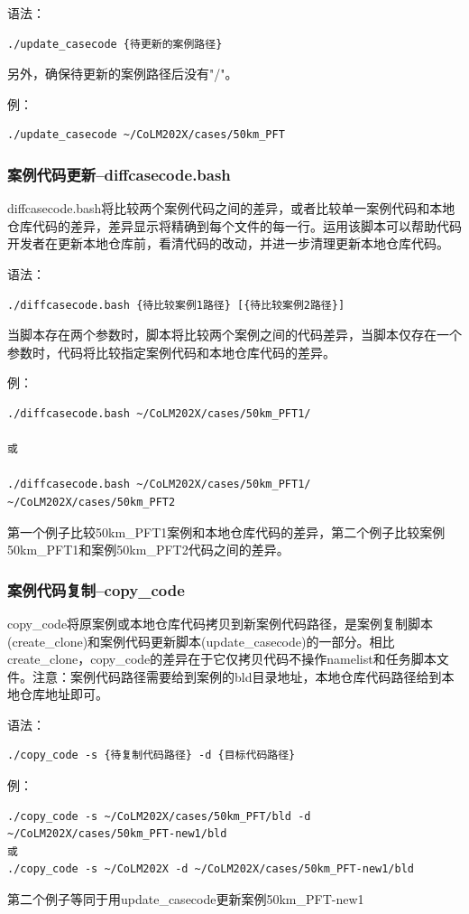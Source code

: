 语法：
\begin{lstlisting}
./update_casecode {待更新的案例路径}
\end{lstlisting}
另外，确保待更新的案例路径后没有"/"。

例：
\begin{lstlisting}
./update_casecode ~/CoLM202X/cases/50km_PFT
\end{lstlisting}

\subsubsection{案例代码更新--diffcasecode.bash}

diffcasecode.bash将比较两个案例代码之间的差异，或者比较单一案例代码和本地仓库代码的差异，差异显示将精确到每个文件的每一行。运用该脚本可以帮助代码开发者在更新本地仓库前，看清代码的改动，并进一步清理更新本地仓库代码。

语法：

\begin{lstlisting}
./diffcasecode.bash {待比较案例1路径} [{待比较案例2路径}]
\end{lstlisting}

当脚本存在两个参数时，脚本将比较两个案例之间的代码差异，当脚本仅存在一个参数时，代码将比较指定案例代码和本地仓库代码的差异。

例：
\begin{lstlisting}
./diffcasecode.bash ~/CoLM202X/cases/50km_PFT1/

或

./diffcasecode.bash ~/CoLM202X/cases/50km_PFT1/ ~/CoLM202X/cases/50km_PFT2
\end{lstlisting}

第一个例子比较50km\_PFT1案例和本地仓库代码的差异，第二个例子比较案例50km\_PFT1和案例50km\_PFT2代码之间的差异。


\subsubsection{案例代码复制--copy\_code}
copy\_code将原案例或本地仓库代码拷贝到新案例代码路径，是案例复制脚本(create\_clone)和案例代码更新脚本(update\_casecode)的一部分。相比create\_clone，copy\_code的差异在于它仅拷贝代码不操作namelist和任务脚本文件。注意：案例代码路径需要给到案例的bld目录地址，本地仓库代码路径给到本地仓库地址即可。

语法：
\begin{lstlisting}
./copy_code -s {待复制代码路径} -d {目标代码路径}
\end{lstlisting}

例：
\begin{lstlisting}
./copy_code -s ~/CoLM202X/cases/50km_PFT/bld -d ~/CoLM202X/cases/50km_PFT-new1/bld
或
./copy_code -s ~/CoLM202X -d ~/CoLM202X/cases/50km_PFT-new1/bld
\end{lstlisting}
第二个例子等同于用update\_casecode更新案例50km\_PFT-new1

\clearpage
